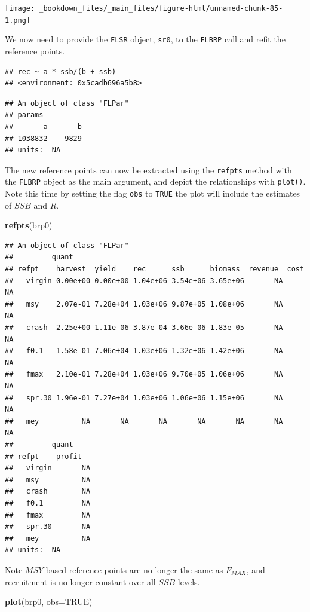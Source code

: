\documentclass[
]{book}
\newenvironment{Shaded}{\begin{snugshade}}{\end{snugshade}}
\newcommand{\AttributeTok}[1]{\textcolor[rgb]{0.13,0.29,0.53}{#1}}
\newcommand{\ConstantTok}[1]{\textcolor[rgb]{0.56,0.35,0.01}{#1}}
\newcommand{\FunctionTok}[1]{\textcolor[rgb]{0.13,0.29,0.53}{\textbf{#1}}}
\newcommand{\NormalTok}[1]{#1}
\begin{document}
\texttt{[image: \_bookdown\_files/\_main\_files/figure-html/unnamed-chunk-85-1.png]}

We now need to provide the \texttt{FLSR} object, \texttt{sr0}, to the \texttt{FLBRP} call and refit the reference points.

\begin{verbatim}
## rec ~ a * ssb/(b + ssb)
## <environment: 0x5cadb696a5b8>
\end{verbatim}

\begin{verbatim}
## An object of class "FLPar"
## params
##       a       b 
## 1038832    9829 
## units:  NA
\end{verbatim}

The new reference points can now be extracted using the \texttt{refpts} method with the \texttt{FLBRP} object as the main argument, and depict the relationships with \texttt{plot()}. Note this time by setting the flag \texttt{obs} to \texttt{TRUE} the plot will include the estimates of \(SSB\) and \(R\).

\begin{Shaded}
\begin{Highlighting}[]
\FunctionTok{refpts}\NormalTok{(brp0)}
\end{Highlighting}
\end{Shaded}

\begin{verbatim}
## An object of class "FLPar"
##         quant
## refpt    harvest  yield    rec      ssb      biomass  revenue  cost    
##   virgin 0.00e+00 0.00e+00 1.04e+06 3.54e+06 3.65e+06       NA       NA
##   msy    2.07e-01 7.28e+04 1.03e+06 9.87e+05 1.08e+06       NA       NA
##   crash  2.25e+00 1.11e-06 3.87e-04 3.66e-06 1.83e-05       NA       NA
##   f0.1   1.58e-01 7.06e+04 1.03e+06 1.32e+06 1.42e+06       NA       NA
##   fmax   2.10e-01 7.28e+04 1.03e+06 9.70e+05 1.06e+06       NA       NA
##   spr.30 1.96e-01 7.27e+04 1.03e+06 1.06e+06 1.15e+06       NA       NA
##   mey          NA       NA       NA       NA       NA       NA       NA
##         quant
## refpt    profit  
##   virgin       NA
##   msy          NA
##   crash        NA
##   f0.1         NA
##   fmax         NA
##   spr.30       NA
##   mey          NA
## units:  NA
\end{verbatim}

Note \(MSY\) based reference points are no longer the same as \(F_{MAX}\), and recruitment is no longer constant over all \(SSB\) levels.

\begin{Shaded}
\begin{Highlighting}[]
\FunctionTok{plot}\NormalTok{(brp0, }\AttributeTok{obs=}\ConstantTok{TRUE}\NormalTok{)}
\end{Highlighting}
\end{Shaded}
\end{document}
